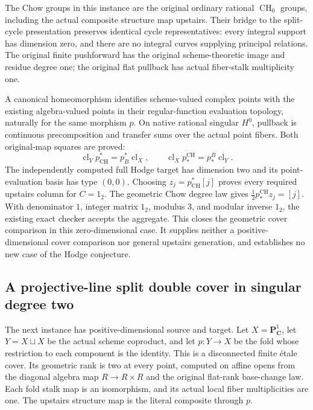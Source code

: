 \documentclass[11pt]{article}
\theoremstyle{definition}
\theoremstyle{remark}
\DeclareMathOperator{\CH}{CH}
\begin{document}
The Chow groups in this instance are the original ordinary rational
\(\CH_0\) groups, including the actual composite structure map upstairs.
Their bridge to the split-cycle presentation preserves identical cycle
representatives: every integral support has dimension zero, and there are no
integral curves supplying principal relations. The original finite
pushforward has the original scheme-theoretic image and residue degree one;
the original flat pullback has actual fiber-stalk multiplicity one.

A canonical homeomorphism identifies scheme-valued complex points with
the existing algebra-valued points in their regular-function evaluation
topology, naturally for the same morphism \(p\). On native rational
singular \(H^0\), pullback is continuous precomposition and transfer sums
over the actual point fibers. Both original-map squares are proved:
\[
 \operatorname{cl}_Y p_{\CH}^*=p_B^*\operatorname{cl}_X,
 \qquad
 \operatorname{cl}_X p_*^{\CH}=p_*^B\operatorname{cl}_Y.
\]
The independently computed full Hodge target has dimension two and its
point-evaluation basis has type \((0,0)\). Choosing
\(z_j=p_{\CH}^*[j]\) proves every required upstairs column for \(C=1_2\).
The geometric Chow degree law gives \(\tfrac12p_*^{\CH}z_j=[j]\).
With denominator \(1\), integer matrix \(1_2\), modulus \(3\), and modular
inverse \(1_2\), the existing exact checker accepts the aggregate.
This closes the geometric cover comparison in this zero-dimensional case.
It supplies neither a positive-dimensional cover comparison nor general
upstairs generation, and establishes no new case of the Hodge conjecture.

\subsection{A projective-line split double cover in singular degree two}
\label{subsec:p1-double-cover}

The next instance has positive-dimensional source and target. Let
\(X=\mathbf P^1_{\mathbf C}\), let \(Y=X\sqcup X\) be the actual scheme
coproduct, and let \(p:Y\to X\) be the fold whose restriction to each
component is the identity. This is a disconnected finite \'{e}tale cover.
Its geometric rank is two at every point, computed on affine opens from
the diagonal algebra map \(R\to R\times R\) and the original flat-rank
base-change law. Each fold stalk map is an isomorphism, and its actual
local fiber multiplicities are one. The upstairs structure map is the
literal composite through \(p\).
\end{document}
